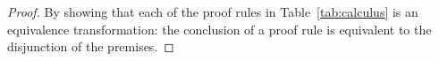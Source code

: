 \begin{proof}
  By showing that each of the proof rules in Table~\ref{tab:calculus}
  is an equivalence transformation: the conclusion of a proof rule is
  equivalent to the disjunction of the premises.
\end{proof}

